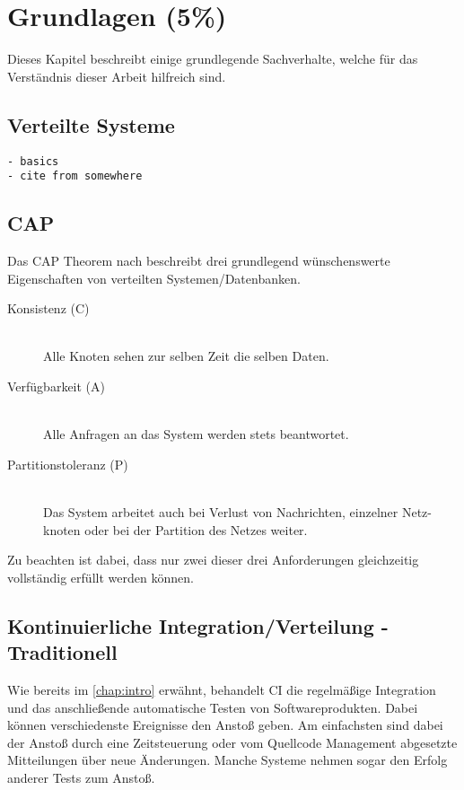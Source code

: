 \chapter{Grundlagen (5\%)}
\label{chap:base}
Dieses Kapitel beschreibt einige grundlegende Sachverhalte,
welche für das Verständnis dieser Arbeit hilfreich sind.

\section{Verteilte Systeme}
\label{sec:base:vs}

\begin{verbatim}
- basics
- cite from somewhere
\end{verbatim}

\section{CAP}
\label{sec:base:cap}
Das \ac{CAP} Theorem nach \cite{brewer:cap} beschreibt drei grundlegend
wünschenswerte Eigenschaften von verteilten Systemen/Datenbanken.

\begin{description}
  \item[Konsistenz (C)] \hfill \\
      Alle Knoten sehen zur selben Zeit die selben Daten. 
  \item[Verfügbarkeit (A)] \hfill \\
      Alle Anfragen an das System werden stets beantwortet.
  \item[Partitionstoleranz (P)] \hfill \\
      Das System arbeitet auch bei Verlust von Nachrichten,
      einzelner Netz-knoten oder bei der Partition des Netzes weiter.
\end{description}

Zu beachten ist dabei, dass nur zwei dieser drei Anforderungen gleichzeitig
vollständig erfüllt werden können.

\section{Kontinuierliche Integration/Verteilung - Traditionell}
\label{sec:base:ci}

Wie bereits im \cref{chap:intro} erwähnt, behandelt \ac{CI} die regelmäßige Integration und das anschließende automatische Testen von Softwareprodukten.
Dabei können verschiedenste Ereignisse den Anstoß geben.
Am einfachsten sind dabei der Anstoß durch eine Zeitsteuerung
oder vom Quellcode Management abgesetzte Mitteilungen über neue Änderungen.
Manche Systeme nehmen sogar den Erfolg anderer Tests zum Anstoß.

